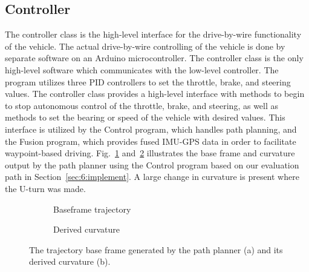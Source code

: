 \subsection{Controller} \label{sec:6:controller}
The controller class is the high-level interface for the drive-by-wire functionality of the vehicle. The actual drive-by-wire controlling of the vehicle is done by separate software on an Arduino microcontroller. The controller class is the only high-level software which communicates with the low-level controller. The program utilizes three PID controllers to set the throttle, brake, and steering values. The controller class provides a high-level interface with methods to begin to stop autonomous control of the throttle, brake, and steering, as well as methods to set the bearing or speed of the vehicle with desired values. This interface is utilized by the Control program, which handles path planning, and the Fusion program, which provides fused IMU-GPS data in order to facilitate waypoint-based driving. Fig.~\ref{fig:6:base frame} and~\ref{fig:6:curvature} illustrates the base frame and curvature output by the path planner using the Control program based on our evaluation path in Section~\ref{sec:6:implement}. A large change in curvature is present where the U-turn was made.


\begin{figure}[H]
	\centering
	\begin{subfigure}[b]{0.45\textwidth}
		\def\svgwidth{\textwidth}
		
		\caption{Baseframe trajectory}
		\label{fig:6:base frame}   
	\end{subfigure} 
	\hspace{1em}         
	\begin{subfigure}[b]{0.45\textwidth}
		\def\svgwidth{\textwidth}
		
		\caption{Derived curvature}
		\label{fig:6:curvature}
	\end{subfigure}             
	\caption[Generated trajectory base frame]{The trajectory base frame generated by the path planner (a) and its derived curvature (b).}
	\label{fig:6:basecurve}
\end{figure}

